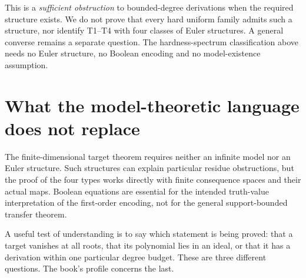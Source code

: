 This is a \emph{sufficient obstruction} to bounded-degree derivations
when the required structure exists. We do not prove that every hard
uniform family admits such a structure, nor identify T1--T4 with four
classes of Euler structures. A general converse remains a separate
question. The hardness-spectrum classification above needs no Euler
structure, no Boolean encoding and no model-existence assumption.

\section{What the model-theoretic language does not replace}
The finite-dimensional target theorem requires neither an infinite model
nor an Euler structure. Such structures can explain particular residue
obstructions, but the proof of the four types works directly with finite
consequence spaces and their actual maps. Boolean equations are essential
for the intended truth-value interpretation of the first-order encoding,
not for the general support-bounded transfer theorem.

A useful test of understanding is to say which statement is being proved:
that a target vanishes at all roots, that its polynomial lies in an ideal,
or that it has a derivation within one particular degree budget. These
are three different questions. The book's profile concerns the last.
